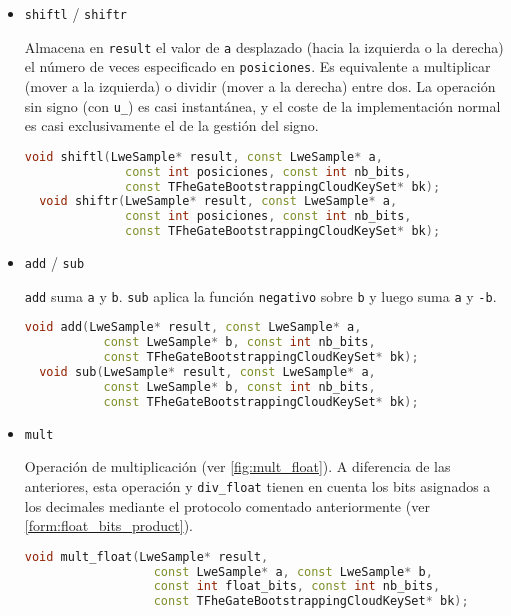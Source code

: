 \begin{itemize}
  \item \texttt{shiftl} / \texttt{shiftr}

  Almacena en \verb|result| el valor de \verb|a| desplazado (hacia la izquierda o la derecha) el número de veces especificado en \verb|posiciones|. Es equivalente a multiplicar (mover a la izquierda) o dividir (mover a la derecha) entre dos. La operación sin signo (con \verb|u_|) es casi instantánea, y el coste de la implementación normal es casi exclusivamente el de la gestión del signo.

  \begin{lstlisting}[language=c++]
  void shiftl(LweSample* result, const LweSample* a,
              const int posiciones, const int nb_bits,
              const TFheGateBootstrappingCloudKeySet* bk);
  void shiftr(LweSample* result, const LweSample* a,
              const int posiciones, const int nb_bits,
              const TFheGateBootstrappingCloudKeySet* bk);
  \end{lstlisting}

  \item \texttt{add} / \texttt{sub}

  \verb|add| suma \verb|a| y \verb|b|. \verb|sub| aplica la función \verb|negativo| sobre \verb|b| y luego suma \verb|a| y \verb|-b|.

  \begin{lstlisting}[language=c++]
  void add(LweSample* result, const LweSample* a,
           const LweSample* b, const int nb_bits,
           const TFheGateBootstrappingCloudKeySet* bk);
  void sub(LweSample* result, const LweSample* a,
           const LweSample* b, const int nb_bits,
           const TFheGateBootstrappingCloudKeySet* bk);
  \end{lstlisting}

  \item \texttt{mult}

  Operación de multiplicación (ver \ref{fig:mult_float}). A diferencia de las anteriores, esta operación y \verb|div_float| tienen en cuenta los bits asignados a los decimales mediante el protocolo comentado anteriormente (ver \ref{form:float_bits_product}).

  \begin{lstlisting}[language=c++]
  void mult_float(LweSample* result,
                  const LweSample* a, const LweSample* b,
                  const int float_bits, const int nb_bits,
                  const TFheGateBootstrappingCloudKeySet* bk);
  \end{lstlisting}


\end{itemize}
